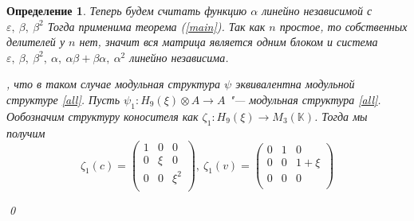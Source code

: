 \documentclass[12pt, reqno, a4paper, oneside, notitlepage]{amsart}
\makeatletter
\theoremstyle{mytheoremstyle}
\theoremstyle{myremarkstyle}
\newtheorem{definition}[theorem]{Определение}
\numberwithin{equation}{section}
\renewenvironment{proof}[1][\proofname]{\par\indent {\bfseries #1\@addpunct{.} }}{\qed}
\makeatother
\begin{document}
\begin{definition}
\begin{proof}
	Теперь будем считать функцию $\alpha$ линейно независимой с $\varepsilon,\ \beta,\ \beta^2$
	Тогда применима теорема (\ref{main}). 
	Так как $n$ простое, то собственных делителей у $n$ нет, 
	значит вся матрица является одним блоком и система $\varepsilon,\ \beta,\ \beta^2,\ \alpha,\ \alpha\beta+\beta\alpha,\ \alpha^2$ линейно независима.
	
    , что в таком случае модульная структура $\psi$ эквивалентна модульной структуре \ref{all}.
    Пусть $\psi_1:H_9(\xi) \otimes A \to A$ "--- модульная структура \ref{all}.
    Ообозначим структуру коносителя как $\zeta_1:H_9(\xi) \to M_3(\mathbb{K})$.
    Тогда мы получим \[
    \zeta_1(c) = 
    \begin{pmatrix}
        1 & 0 & 0\\
        0 & \xi & 0\\
        0 & 0 & \xi^2\\
    \end{pmatrix},\ 
    \zeta_1(v) = 
    \begin{pmatrix}
        0 & 1 & 0\\
        0 & 0 & 1+\xi\\
        0 & 0 & 0\\
    \end{pmatrix}
    \]


\end{proof}
\end{definition}
\end{document}
